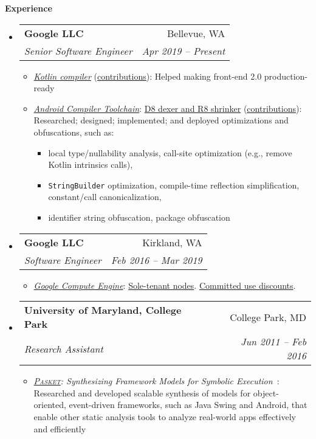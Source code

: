 \documentclass[letterpaper,11pt]{article}
\makeatletter
\newcommand{\resheading}[1]{{\large \colorbox{mygrey}{\begin{minipage}{\textwidth}{\textbf{#1 \vphantom{p\^{E}}}}\end{minipage}}}}
\newcommand{\ressubheading}[4]{
\begin{tabular*}{6.5in}{l@{\extracolsep{\fill}}r}
    \textbf{#1} & #2 \\
    \textit{#3} & \textit{#4} \\
\end{tabular*}\vspace{-6pt}}
\makeatother
\begin{document}
\resheading{Experience}
  \begin{itemize}
    \item
      \ressubheading{{Google LLC}}{Bellevue, WA}{Senior Software Engineer}{Apr 2019 -- Present}
        {
\small
        \begin{itemize}
\item\emph{\href{https://github.com/JetBrains/kotlin}{Kotlin compiler}} (\href{https://github.com/JetBrains/kotlin/commits?author=jsjeon}{\underline{contributions}}):
Helped making front-end 2.0 production-ready
\item\emph{\href{https://developer.android.com/studio/preview/index.html}{Android Compiler Toolchain}}:
\href{https://r8.googlesource.com/r8}{D8 dexer and R8 shrinker} (\href{https://r8-review.googlesource.com/q/author:jsjeon+status:merged}{\underline{contributions}}):
Researched; designed; implemented; and deployed optimizations and obfuscations, such as:
\begin{itemize}
\item local type/nullability analysis, call-site optimization (e.g., remove Kotlin intrinsics calls),
\item \texttt{StringBuilder} optimization, compile-time reflection simplification, constant/call canonicalization,
\item identifier string obfuscation, package obfuscation
\end{itemize}
        \end{itemize}
        }
    \item
      \ressubheading{{Google LLC}}{Kirkland, WA}{Software Engineer}{Feb 2016 -- Mar 2019}
        {
\small
        \begin{itemize}
\item\emph{\href{https://cloud.google.com/compute/}{Google Compute Engine}}:
\href{https://cloudplatform.googleblog.com/2018/06/Introducing-sole-tenant-nodes-for-Google-Compute-Engine.html}{Sole-tenant nodes}.
\href{https://cloudplatform.googleblog.com/2017/09/committed-use-discounts-for-Google-Compute-Engine-now-generally-available.html}{Committed use discounts}.
        \end{itemize}
        }
    \item
      \ressubheading{{University of Maryland, College Park}}{College Park, MD}{Research Assistant}{Jun 2011 -- Feb 2016}
        {
\small
        \begin{itemize}
\item\emph{\href{https://github.com/plum-umd/pasket}{\textsc{Pasket}}: Synthesizing Framework Models for Symbolic Execution}~\cite{FMSD17, icse16, fse15, cav15}: %
Researched and developed scalable synthesis of models for object-oriented,
event-driven frameworks, such as Java Swing and Android,
that enable other static analysis tools
to analyze real-world apps effectively and efficiently


\end{itemize}}
\end{itemize}
\end{document}
